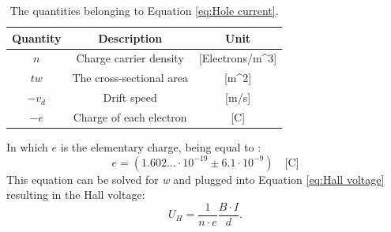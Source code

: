     \begin{table}[!htbp]
    \centering
    \caption{The quantities belonging to Equation \ref{eq:Hole current}.}
    \label{table:Hole current}
    \begin{tabular}{|c|c|c|}
    \hline
    \textbf{Quantity}   & \textbf{Description}           & \textbf{Unit}            \\ \hline
    $n$                  & Charge carrier density    & {[}Electrons/m^3{]}                     \\ \hline
    $tw$                  & The cross-sectional area         & {[}m^2{]}                     \\ \hline
    $-v_d$                  & Drift speed           & {[}m/s{]}                     \\ \hline
    $-e$                  & Charge of each electron & {[}C{]} \\ \hline
    \end{tabular}
    \end{table}
In which $e$ is the elementary charge, being equal to \cite{elementarycharge}:
\begin{equation}
    e = (1.602... \cdot 10^{-19} \pm 6.1 \cdot 10^{-9}) \quad \text{[C]} \label{eq:e}
\end{equation}
This equation can be solved for \emph{w} and plugged into Equation \ref{eq:Hall voltage} resulting in the Hall voltage:
 \begin{equation}
        U_H = \frac{1}{n \cdot e} \frac{B \cdot I}{d}. \label{eq:Hall Voltage2}
    \end{equation}

